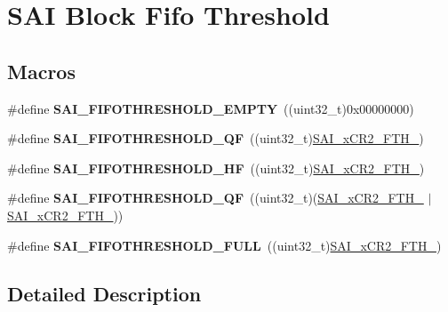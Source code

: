 \hypertarget{group___s_a_i___block___fifo___threshold}{}\section{S\+AI Block Fifo Threshold}
\label{group___s_a_i___block___fifo___threshold}
\subsection*{Macros}
\begin{DoxyCompactItemize}
\item 
\#define {\bfseries S\+A\+I\+\_\+\+F\+I\+F\+O\+T\+H\+R\+E\+S\+H\+O\+L\+D\+\_\+\+E\+M\+P\+TY}~((uint32\+\_\+t)0x00000000)\hypertarget{group___s_a_i___block___fifo___threshold_ga441bd4d4352f9ce1675f792c576bf09c}{}\label{group___s_a_i___block___fifo___threshold_ga441bd4d4352f9ce1675f792c576bf09c}

\item 
\#define {\bfseries S\+A\+I\+\_\+\+F\+I\+F\+O\+T\+H\+R\+E\+S\+H\+O\+L\+D\+\_\+QF}~((uint32\+\_\+t)\hyperlink{group___peripheral___registers___bits___definition_gaa71082a8712881f93ee19875609c699a}{S\+A\+I\+\_\+x\+C\+R2\+\_\+\+F\+T\+H\+\_})\hypertarget{group___s_a_i___block___fifo___threshold_ga80a9fc9f36831711474914bda64ebc56}{}\label{group___s_a_i___block___fifo___threshold_ga80a9fc9f36831711474914bda64ebc56}

\item 
\#define {\bfseries S\+A\+I\+\_\+\+F\+I\+F\+O\+T\+H\+R\+E\+S\+H\+O\+L\+D\+\_\+\+HF}~((uint32\+\_\+t)\hyperlink{group___peripheral___registers___bits___definition_gada48fb2897794cd0d5436909c9706046}{S\+A\+I\+\_\+x\+C\+R2\+\_\+\+F\+T\+H\+\_})\hypertarget{group___s_a_i___block___fifo___threshold_gaa4139f839d779a47ac45850a6a5f2c0a}{}\label{group___s_a_i___block___fifo___threshold_gaa4139f839d779a47ac45850a6a5f2c0a}

\item 
\#define {\bfseries S\+A\+I\+\_\+\+F\+I\+F\+O\+T\+H\+R\+E\+S\+H\+O\+L\+D\+\_\+QF}~((uint32\+\_\+t)(\hyperlink{group___peripheral___registers___bits___definition_gada48fb2897794cd0d5436909c9706046}{S\+A\+I\+\_\+x\+C\+R2\+\_\+\+F\+T\+H\+\_} $\vert$ \hyperlink{group___peripheral___registers___bits___definition_gaa71082a8712881f93ee19875609c699a}{S\+A\+I\+\_\+x\+C\+R2\+\_\+\+F\+T\+H\+\_}))\hypertarget{group___s_a_i___block___fifo___threshold_ga86314b15af7c82a9ceb3f5c7c14894ce}{}\label{group___s_a_i___block___fifo___threshold_ga86314b15af7c82a9ceb3f5c7c14894ce}

\item 
\#define {\bfseries S\+A\+I\+\_\+\+F\+I\+F\+O\+T\+H\+R\+E\+S\+H\+O\+L\+D\+\_\+\+F\+U\+LL}~((uint32\+\_\+t)\hyperlink{group___peripheral___registers___bits___definition_ga6d5eb07982aa5bbfff3e392351ad7735}{S\+A\+I\+\_\+x\+C\+R2\+\_\+\+F\+T\+H\+\_})\hypertarget{group___s_a_i___block___fifo___threshold_ga47af15ae3f3d3a23b81a095bca35d66d}{}\label{group___s_a_i___block___fifo___threshold_ga47af15ae3f3d3a23b81a095bca35d66d}

\end{DoxyCompactItemize}


\subsection{Detailed Description}
